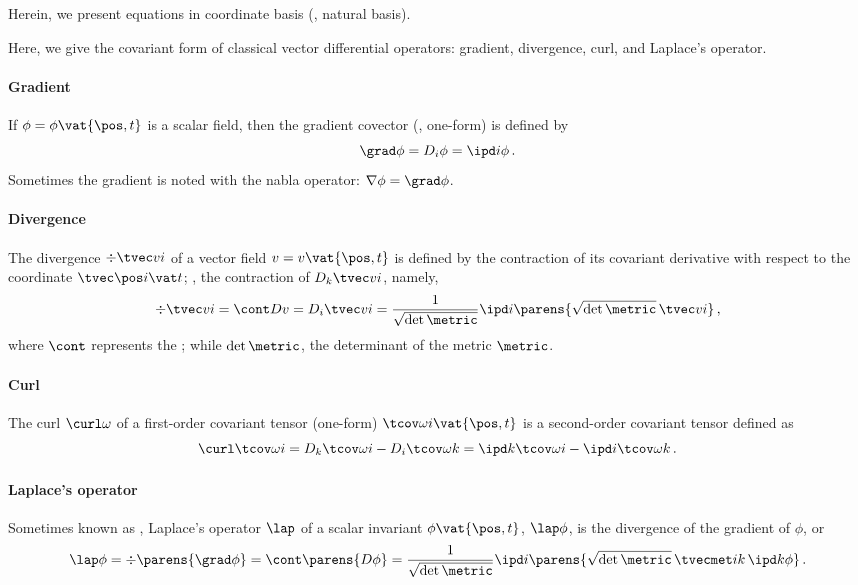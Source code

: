 Herein, we present equations in coordinate basis (\aka, natural basis).

Here, we give the covariant form of classical vector differential operators: gradient, divergence, curl, and Laplace's operator.

\paragraph{Gradient} If $\phi = \phi\vat{\pos,t}$ is a scalar field, then the gradient covector (\aka, one-form) is defined by
%
\begin{equation*}
  \grad\phi = D_i\phi
            = \ipd i\phi\,.
\end{equation*}
%
Sometimes the gradient is noted with the nabla operator: $\nabla\phi = \grad\phi$.

\paragraph{Divergence} The divergence $\div\tvec vi$ of a vector field $v = v\vat{\pos,t}$ is defined by the contraction of its covariant derivative with respect to the coordinate $\tvec\pos i\vat t$; \ie, the contraction of $D_k\tvec vi$, namely,
%
\begin{equation*}
  \div\tvec vi  = \cont Dv
                = D_i\tvec vi
                = \dfrac{1}{\sqrt{\det\metric}}\ipd i\parens{\sqrt{\det\metric}\,\tvec vi}\,,
\end{equation*}
%
where $\cont$ represents the ; while $\det\metric$, the determinant of the metric $\metric$.

\paragraph{Curl} The curl $\curl\omega$ of a first-order covariant tensor (one-form) $\tcov\omega i\vat{\pos,t}$ is a second-order covariant tensor defined as
%
\begin{equation*}
  \curl\tcov\omega i  = D_k\tcov\omega i - D_i\tcov\omega k
                      = \ipd k\tcov\omega i - \ipd i\tcov\omega k\,.
\end{equation*}

\paragraph{Laplace's operator} Sometimes known as , Laplace's operator $\lap$ of a scalar invariant $\phi\vat{\pos,t}$, $\lap\phi$, is the divergence of the gradient of $\phi$, or
%
\begin{equation*}
  \lap\phi  = \div\parens{\grad\phi}
            = \cont\parens{D\phi}
            = \dfrac{1}{\sqrt{\det\metric}}\ipd i\parens{\sqrt{\det\metric}\,\tvecmet ik\,\ipd k\phi}\,.
\end{equation*}

